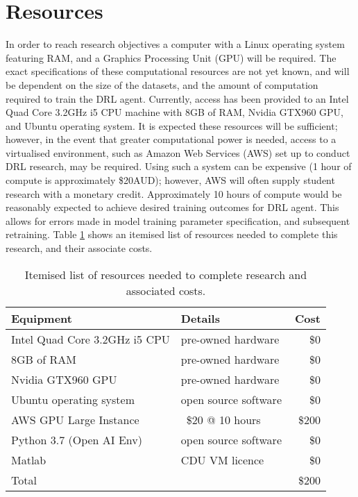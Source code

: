 \section{Resources}
In order to reach research objectives a computer with a Linux operating system featuring RAM, and a Graphics Processing Unit (GPU) will be required. The exact specifications of these computational resources are not yet known, and will be dependent on the size of the datasets, and the amount of computation required to train the DRL agent. Currently, access has been provided to an Intel Quad Core 3.2$\si{\giga\hertz}$ i5 CPU machine with 8GB of RAM, Nvidia GTX960 GPU, and Ubuntu operating system. It is expected these resources will be sufficient; however, in the event that greater computational power is needed, access to a virtualised environment, such as Amazon Web Services (AWS) set up to conduct DRL research, may be required. Using such a system can be expensive (1 hour of compute is approximately \$20AUD); however, AWS will often supply student research with a monetary credit. Approximately 10 hours of compute would be reasonably expected to achieve desired training outcomes for DRL agent. This allows for errors made in model training parameter specification, and subsequent retraining.
Table \ref{tab:resources} shows an itemised list of resources needed to complete this research, and their associate costs.

\begin{table}[h]
	\caption{Itemised list of resources needed to complete research and associated costs.}
	\centering
	\begin{tabular}{llr}
	\toprule
	Equipment 				& Details			 & Cost \\
	\midrule
	Intel Quad Core 3.2$\si{\giga\hertz}$ i5 CPU & pre-owned hardware 		& \$0 	 \\
	8GB of RAM 									 & pre-owned hardware		& \$0 	 \\
	Nvidia GTX960 GPU 							 & pre-owned hardware		& \$0 	 \\
	Ubuntu operating system 					 & open source software		& \$0 	 \\
	AWS GPU Large Instance 						 & ~\$20 @ 10 hours 		& ~\$200 \\
	Python 3.7 (Open AI Env)  					 & open source software 	& \$0 	 \\
	Matlab										 & CDU VM licence			& \$0 	 \\
	\midrule
	Total 										 & 							& \$200 \\
	\bottomrule
	\end{tabular}
	\label{tab:resources}
\end{table}